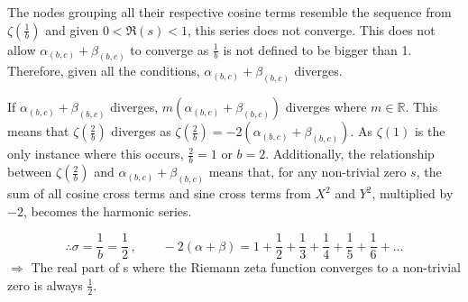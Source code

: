 \documentclass{amsart}
\begin{document}
	The nodes grouping all their respective cosine terms resemble the sequence from $\zeta(\frac{1}{b})$ and given $0<\Re(s)<1$, this series does not converge. This does not allow $\alpha_{(b,c)} + \beta_{(b,c)}$ to converge as $\frac{1}{b}$ is not defined to be bigger than 1. Therefore, given all the conditions, $\alpha_{(b,c)} + \beta_{(b,c)}$ diverges.
	
	If $\alpha_{(b,c)} + \beta_{(b,c)}$ diverges, $m(\alpha_{(b,c)} + \beta_{(b,c)})$ diverges where $m \in \mathbb{R}$. This means that $\zeta(\frac{2}{b})$ diverges as $\zeta(\frac{2}{b}) = -2(\alpha_{(b,c)} + \beta_{(b,c)})$. As $\zeta(1)$ is the only instance where this occurs, $\frac{2}{b} = 1$ or $b=2$. Additionally, the relationship between $\zeta(\frac{2}{b})$ and $\alpha_{(b,c)} + \beta_{(b,c)}$ means that, for any non-trivial zero $s$, the sum of all cosine cross terms and sine cross terms from $X^2$ and $Y^2$, multiplied by $-2$, becomes the harmonic series.
	
	
	\[ \therefore \sigma = \frac{1}{b} = \frac{1}{2} \, , \qquad -2(\alpha + \beta) = 1+\frac{1}{2}+\frac{1}{3}+\frac{1}{4}+\frac{1}{5}+\frac{1}{6}+... \]
	$\Rightarrow$ The real part of s where the Riemann zeta function converges to a non-trivial zero is always $\frac{1}{2}$.
	
	
	
	
\end{document}
